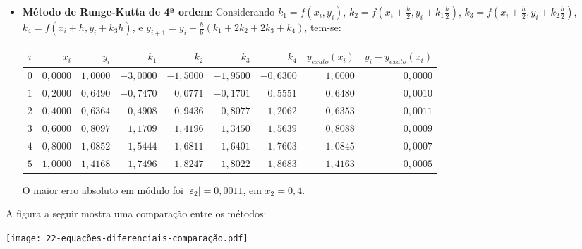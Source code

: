 \documentclass[12pt,a4paper]{article}
\begin{document}
\begin{enumerate}
\begin{itemize}
\item \textbf{Método de Runge-Kutta de 4ª ordem}: Considerando
$k_1 = f(x_i, y_i)$,
$k_2 = f(x_i + \frac{h}{2}, y_i + k_1 \frac{h}{2})$,
$k_3 = f(x_i + \frac{h}{2}, y_i + k_2 \frac{h}{2})$,
$k_4 = f(x_i +       h    , y_i + k_3 h)$, e
$y_{i+1} = y_i + \frac{h}{6} (k_1 + 2k_2 + 2k_3 + k_4)$, tem-se:
\begin{center}
   \begin{footnotesize}
      \begin{tabular}{crrrrrrrr}
      \hline
        $i$ & $x_i$  & $y_i$ & $k_1$ & $k_2$ & $k_3$ & $k_4$ & $y_{exato}(x_i)$
        & $y_i-y_{exato}(x_i)$ \\ \hline
      $0$ & $0,0000$ & $1,0000$ & $-3,0000$ & $-1,5000$ & $-1,9500$ & $-0,6300$ & $1,0000$ & $0,0000$ \\
      $1$ & $0,2000$ & $0,6490$ & $-0,7470$ & $ 0,0771$ & $-0,1701$ & $ 0,5551$ & $0,6480$ & $0,0010$ \\
      $2$ & $0,4000$ & $0,6364$ & $ 0,4908$ & $ 0,9436$ & $ 0,8077$ & $ 1,2062$ & $0,6353$ & $0,0011$ \\
      $3$ & $0,6000$ & $0,8097$ & $ 1,1709$ & $ 1,4196$ & $ 1,3450$ & $ 1,5639$ & $0,8088$ & $0,0009$ \\
      $4$ & $0,8000$ & $1,0852$ & $ 1,5444$ & $ 1,6811$ & $ 1,6401$ & $ 1,7603$ & $1,0845$ & $0,0007$ \\
      $5$ & $1,0000$ & $1,4168$ & $ 1,7496$ & $ 1,8247$ & $ 1,8022$ & $ 1,8683$ & $1,4163$ & $0,0005$ \\
      \hline
      \end{tabular}
   \end{footnotesize}
\end{center}
O maior erro absoluto em módulo foi $|\varepsilon_2| = 0,0011$, em $x_2 = 0,4$.
\end{itemize}

A figura a seguir mostra uma comparação entre os métodos:
\begin{center}
   \texttt{[image: 22-equações-diferenciais-comparação.pdf]}
\end{center}
\end{enumerate}
\end{document}
